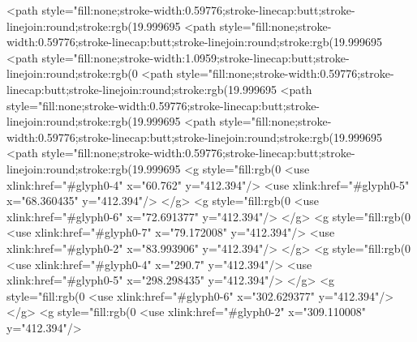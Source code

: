 <path style="fill:none;stroke-width:0.59776;stroke-linecap:butt;stroke-linejoin:round;stroke:rgb(19.999695%
<path style="fill:none;stroke-width:0.59776;stroke-linecap:butt;stroke-linejoin:round;stroke:rgb(19.999695%
<path style="fill:none;stroke-width:1.0959;stroke-linecap:butt;stroke-linejoin:round;stroke:rgb(0%
<path style="fill:none;stroke-width:0.59776;stroke-linecap:butt;stroke-linejoin:round;stroke:rgb(19.999695%
<path style="fill:none;stroke-width:0.59776;stroke-linecap:butt;stroke-linejoin:round;stroke:rgb(19.999695%
<path style="fill:none;stroke-width:0.59776;stroke-linecap:butt;stroke-linejoin:round;stroke:rgb(19.999695%
<path style="fill:none;stroke-width:0.59776;stroke-linecap:butt;stroke-linejoin:round;stroke:rgb(19.999695%
<g style="fill:rgb(0%
  <use xlink:href="#glyph0-4" x="60.762" y="412.394"/>
  <use xlink:href="#glyph0-5" x="68.360435" y="412.394"/>
</g>
<g style="fill:rgb(0%
  <use xlink:href="#glyph0-6" x="72.691377" y="412.394"/>
</g>
<g style="fill:rgb(0%
  <use xlink:href="#glyph0-7" x="79.172008" y="412.394"/>
  <use xlink:href="#glyph0-2" x="83.993906" y="412.394"/>
</g>
<g style="fill:rgb(0%
  <use xlink:href="#glyph0-4" x="290.7" y="412.394"/>
  <use xlink:href="#glyph0-5" x="298.298435" y="412.394"/>
</g>
<g style="fill:rgb(0%
  <use xlink:href="#glyph0-6" x="302.629377" y="412.394"/>
</g>
<g style="fill:rgb(0%
  <use xlink:href="#glyph0-2" x="309.110008" y="412.394"/>
